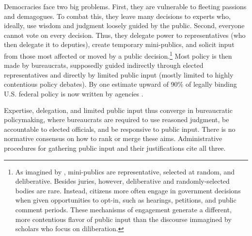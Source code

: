 
Democracies face two big problems. First, they are vulnerable to fleeting passions and demagogues. To combat this, they leave many decisions to experts who, ideally, use wisdom and judgment loosely guided by the public. Second, everyone cannot vote on every decision. Thus, they delegate power to representatives (who then delegate it to deputies), create temporary mini-publics,
and solicit input from those most affected or moved by a public decision.\footnote{
As imagined by \citet{Dahl1989}, mini-publics are representative, selected at random, and deliberative. Besides juries, however, deliberative and randomly-selected bodies are rare. Instead, citizens more often engage in government decisions when given opportunities to opt-in, such as hearings, petitions, and public comment periods. These mechanisms of engagement generate a different, more contentious flavor of public input than the discourse immagined by scholars who focus on diliberation.
}
Most policy is then made by bureaucrats, supposedly guided indirectly through elected representatives and directly by limited public input (mostly limited to highly contentious policy debates).
By one estimate upward of 90\% of legally binding U.S. federal policy is now written by agencies \citep{West2013}.


Expertise, delegation, and limited public input thus converge in bureaucratic policymaking, where bureaucrats are required to use reasoned judgment, be accountable to elected officials, and be responsive to public input. There is no normative consensus on how to rank or merge these aims.
Administrative procedures for gathering public input and their justifications cite all three.

